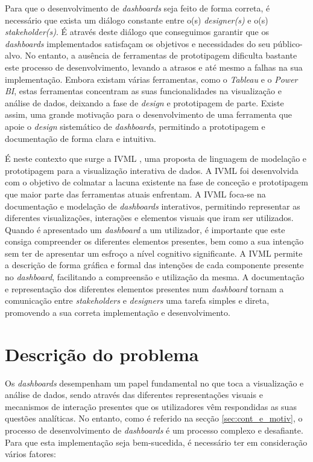 Para que o desenvolvimento de \textit{dashboards} seja feito de forma correta, é necessário que exista um diálogo constante entre o(s) \textit{designer(s)} e o(s) \textit{stakeholder(s)}. É através deste diálogo que conseguimos garantir que os \textit{dashboards} implementados satisfaçam os objetivos e necessidades do seu público-alvo. No entanto, a ausência de ferramentas de prototipagem dificulta bastante este processo de desenvolvimento, levando a atrasos e até mesmo a falhas na sua implementação. Embora existam várias ferramentas, como o \textit{Tableau} e o \textit{Power BI}, estas ferramentas concentram as suas funcionalidades na visualização e análise de dados, deixando a fase de \textit{design} e prototipagem de parte. Existe assim, uma grande motivação para o desenvolvimento de uma ferramenta que apoie o \textit{design} sistemático de \textit{dashboards}, permitindo a prototipagem e documentação de forma clara e intuitiva.

É neste contexto que surge a \gls{IVML} \cite{Ferreira2023IVML}, uma proposta de linguagem de modelação e prototipagem para a visualização interativa de dados. A \gls{IVML} foi desenvolvida com o objetivo de colmatar a lacuna existente na fase de conceção e prototipagem que maior parte das ferramentas atuais enfrentam. A \gls{IVML} foca-se na documentação e modelação de \textit{dashboards} interativos, permitindo representar as diferentes visualizações, interações e elementos visuais que iram ser utilizados. Quando é apresentado um \textit{dashboard} a um utilizador, é importante que este consiga compreender os diferentes elementos presentes, bem como a sua intenção sem ter de apresentar um esfroço a nível cognitivo significante. A \gls{IVML} permite a descrição de forma gráfica e formal das intenções de cada componente presente no \textit{dashboard}, facilitando a compreensão e utilização da mesma. A documentação e representação dos diferentes elementos presentes num \textit{dashboard} tornam a comunicação entre \textit{stakeholders} e \textit{designers} uma tarefa simples e direta, promovendo a sua correta implementação e desenvolvimento.

\section{Descrição do problema}
\label{sec:des_problema}

Os \textit{dashboards} desempenham um papel fundamental no que toca a visualização e análise de dados, sendo através das diferentes representações visuais e mecanismos de interação presentes que os utilizadores vêm respondidas as suas questões analíticas. No entanto, como é referido na secção \ref{sec:cont_e_motiv}, o processo de desenvolvimento de \textit{dashboards} é um processo complexo e desafiante. Para que esta implementação seja bem-sucedida, é necessário ter em consideração vários fatores:

